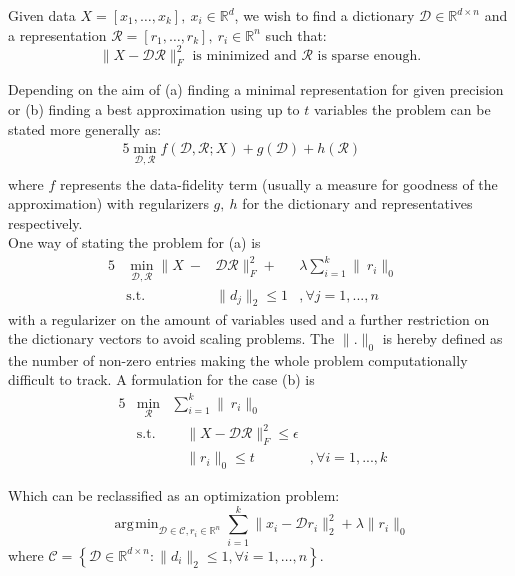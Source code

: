 \documentclass{article}
\newcommand{\R}{\mathbb{R}}
\DeclareMathOperator*{\argmin}{\arg\!\min}
\begin{document}
Given data $X = [x_1,\dots , x_k], \ x_i\in\R^d$, we wish to find a dictionary $\mathcal{D}\in\R^{d \times n}$ and a representation $\mathcal{R} = [r_1, \dots, r_k], \ r_i\in\R^n$ such that: $$\|X-\mathcal{D}\mathcal{R}\|_F^2 \text{ is minimized and } \mathcal{R} \text{ is sparse enough.}$$

\noindent Depending on the aim of (a) finding a minimal representation for given precision or (b) finding a best approximation using up to $t$ variables the problem can be stated more generally as:
\begin{alignat*}{5}
          \min_{\mathcal{D}, \mathcal{R}}  f(\mathcal{D}, \mathcal{R}; X) + g(\mathcal{D}) + h(\mathcal{R})      & \quad  & \\
\end{alignat*}
where $f$ represents the data-fidelity term (usually a measure for goodness of the approximation) with regularizers $g,\ h$ for the dictionary and representatives respectively.
\\
One way of stating the problem for (a) is
\begin{alignat}{5}
         & \min_{\mathcal{D}, \mathcal{R}} \|X \ -&\mathcal{D}\mathcal{R}\|_F^2  + &\lambda \sum_{i=1}^k  \|\ r_i\|_0     \quad   \\
         &\text{s.t.}  \quad  &\|d_j\|_2 \leq 1&, \forall j=1, ...,n  \quad 
\end{alignat}
with a regularizer on the amount of variables used and a further restriction on the dictionary vectors to avoid scaling problems. The $\| .\|_0$ is hereby defined as the number of non-zero entries making the whole problem computationally difficult to track\cite{NPHardproof}. A formulation for the case (b) is 
\begin{alignat}{5}
          &\min_{\mathcal{R}} &\sum_{i=1}^k  \|\ r_i\|_0     \quad  & \\
         &\text{s.t.}  &\quad  \|X-\mathcal{D}\mathcal{R}\|_F^2 \leq \epsilon & \quad \\
          & \ & \quad  \| r_i \|_0 \leq t  &, \forall i=1, ..., k  \quad 
\end{alignat}

Which can be reclassified as an optimization problem: $$\argmin_{\mathcal{D}\in\mathcal{C}, r_i\in\R^n} \sum_{i=1}^k \|x_i - \mathcal{D}r_i\|_2^2 + \lambda\|r_i\|_0$$
where $\mathcal{C} = \left\{\mathcal{D}\in\R^{d \times n} : \|d_i\|_2 \leq 1, \forall i=1, \dots, n\right\}$.\\
\end{document}
